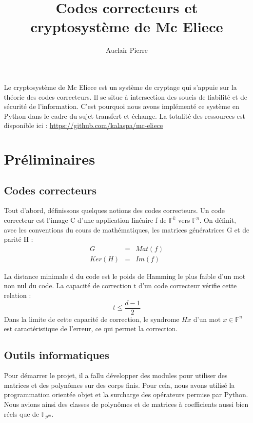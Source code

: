 \documentclass{article}
\title{Codes correcteurs et cryptosystème de Mc Eliece}
\author{Auclair Pierre}
\begin{document}
	\maketitle

	Le cryptosystème de Mc Eliece est un système de cryptage qui s'appuie sur la théorie des codes correcteurs.
	Il se situe à intersection des soucis de fiabilité et de sécurité de l'information.
	C'est pourquoi nous avons implémenté ce système en Python dans le cadre du sujet transfert et échange.
	La totalité des ressources est disponible ici : \url{https://github.com/kalaspa/mc-eliece}


	\section{Préliminaires}

		\subsection*{Codes correcteurs}
			\cite{04cc}
			Tout d'abord, définissons quelques notions des codes correcteurs.
			Un code correcteur est l'image C d'une application linéaire f de $\mathbb{F}^{k}$ vers $\mathbb{F}^{n}$.
			On définit, avec les conventions du cours de mathématiques, les matrices génératrices G et de parité H :
			\begin{eqnarray*}
				G &=& Mat(f) \\
				Ker(H) &=& Im(f)
			\end{eqnarray*}

			La distance minimale d du code est le poids de Hamming le plus faible d'un mot non nul du code.
			La capacité de correction t d'un code correcteur vérifie cette relation :
			$$
				t \leq \frac{d-1}{2}
			$$
			Dans la limite de cette capacité de correction, le syndrome $Hx$ d'un mot $x \in \mathbb{F}^{n}$ est caractéristique de l'erreur, ce qui permet la correction.

		\subsection*{Outils informatiques}
			Pour démarrer le projet, il a fallu développer des modules pour utiliser des matrices et des polynômes sur des corps finis.
			Pour cela, nous avons utilisé la programmation orientée objet et la surcharge des opérateurs permise par Python.
			Nous avions ainsi des classes de polynômes et de matrices à coefficients aussi bien réels que de $\mathbb{F}_{p^{m}}$.
\end{document}
